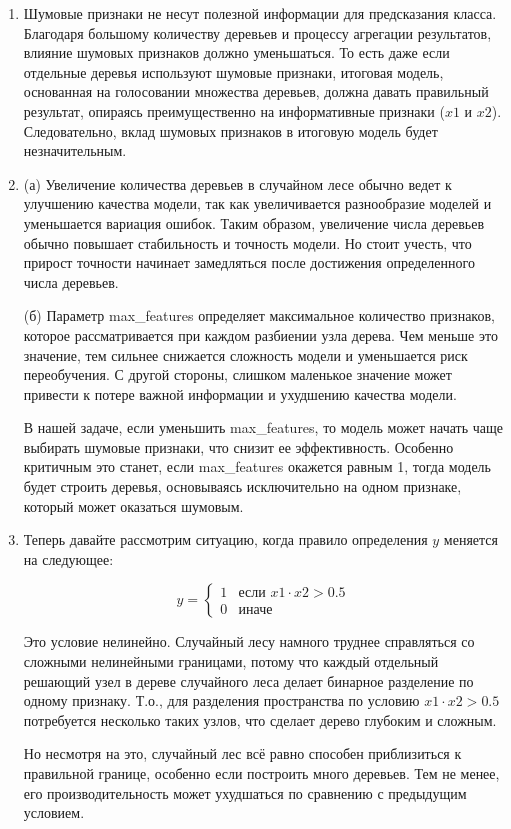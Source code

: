 \begin{enumerate}

    \item Шумовые признаки не несут полезной информации для предсказания класса. Благодаря большому количеству деревьев и процессу агрегации результатов, влияние шумовых признаков должно уменьшаться. То есть даже если отдельные деревья используют шумовые признаки, итоговая модель, основанная на голосовании множества деревьев, должна давать правильный результат, опираясь преимущественно на информативные признаки ($x1$ и $x2$). Следовательно, вклад шумовых признаков в итоговую модель будет незначительным.

    \item (а) Увеличение количества деревьев в случайном лесе обычно ведет к улучшению качества модели, так как увеличивается разнообразие моделей и уменьшается вариация ошибок. Таким образом, увеличение числа деревьев обычно повышает стабильность и точность модели. Но стоит учесть, что прирост точности начинает замедляться после достижения определенного числа деревьев.

          (б) Параметр max\_features определяет максимальное количество признаков, которое рассматривается при каждом разбиении узла дерева. Чем меньше это значение, тем сильнее снижается сложность модели и уменьшается риск переобучения. С другой стороны, слишком маленькое значение может привести к потере важной информации и ухудшению качества модели.

          В нашей задаче, если уменьшить max\_features, то модель может начать чаще выбирать шумовые признаки, что снизит ее эффективность. Особенно критичным это станет, если max\_features окажется равным 1, тогда модель будет строить деревья, основываясь исключительно на одном признаке, который может оказаться шумовым.

    \item Теперь давайте рассмотрим ситуацию, когда правило определения $y$ меняется на следующее:

          $$
              y = \begin{cases}
                  1 & \text{если } x1 \cdot x2 > 0.5 \\
                  0 & \text{иначе}
              \end{cases}
          $$

          Это условие нелинейно. Случайный лесу намного труднее справляться со сложными нелинейными границами, потому что каждый отдельный решающий узел в дереве случайного леса делает бинарное разделение по одному признаку. Т.о., для разделения пространства по условию $x1 \cdot x2 > 0.5$ потребуется несколько таких узлов, что сделает дерево глубоким и сложным.

          Но несмотря на это, случайный лес всё равно способен приблизиться к правильной границе, особенно если построить много деревьев. Тем не менее, его производительность может ухудшаться по сравнению с предыдущим условием.

\end{enumerate}
